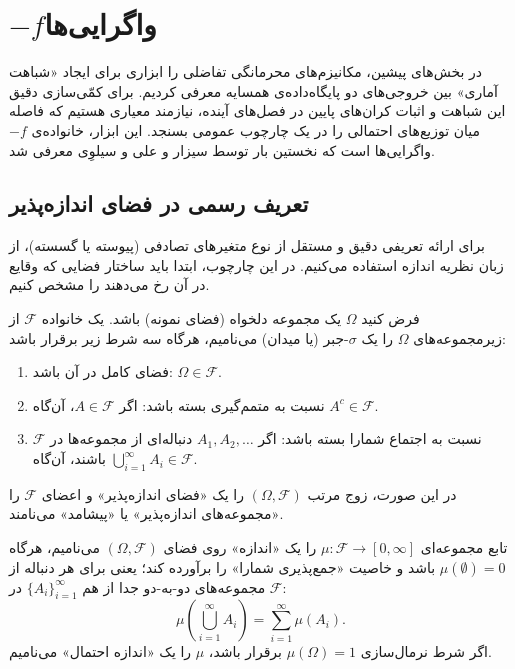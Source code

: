 \section{$-f$واگرایی‌ها}
\label{sec:bg:f-divergence}
در بخش‌های پیشین، مکانیزم‌های محرمانگی تفاضلی را ابزاری برای ایجاد «شباهت آماری» بین خروجی‌های دو پایگاه‌داده‌ی همسایه معرفی کردیم. برای کمّی‌سازی دقیق این شباهت و اثبات کران‌های پایین در فصل‌های آینده، نیازمند معیاری هستیم که فاصله میان توزیع‌های احتمالی را در یک چارچوب عمومی بسنجد. این ابزار، خانواده‌ی $-f$واگرایی‌ها است که نخستین بار توسط سیزار \cite{csiszar1963information} و علی و سیلوِی \cite{Ali1966Silvey} معرفی شد.
\subsection{تعریف رسمی در فضای اندازه‌پذیر}
\label{sec:bg:f-div-def}

برای ارائه تعریفی دقیق و مستقل از نوع متغیرهای تصادفی (پیوسته یا گسسته)، از زبان نظریه اندازه استفاده می‌کنیم. در این چارچوب، ابتدا باید ساختار فضایی که وقایع در آن رخ می‌دهند را مشخص کنیم.
\begin{تعریف}
\label{def:sigma-algebra}
فرض کنید $\Omega$ یک مجموعه دلخواه (فضای نمونه) باشد. یک خانواده $\mathcal{F}$ از زیرمجموعه‌های $\Omega$ را یک $\sigma$-جبر (یا میدان) می‌نامیم، هرگاه سه شرط زیر برقرار باشد:
\begin{enumerate}
    \item فضای کامل در آن باشد: $\Omega \in \mathcal{F}$.
    \item نسبت به متمم‌گیری بسته باشد: اگر $A \in \mathcal{F}$، آن‌گاه $A^c \in \mathcal{F}$.
    \item نسبت به اجتماع شمارا بسته باشد: اگر $A_1, A_2, \dots$ دنباله‌ای از مجموعه‌ها در $\mathcal{F}$ باشند، آن‌گاه $\bigcup_{i=1}^{\infty} A_i \in \mathcal{F}$.
\end{enumerate}
در این صورت، زوج مرتب $(\Omega, \mathcal{F})$ را یک «فضای اندازه‌پذیر» و اعضای $\mathcal{F}$ را «مجموعه‌های اندازه‌پذیر» یا «پیشامد» می‌نامند.
\end{تعریف}

\begin{تعریف}
\label{def:measure}
تابع مجموعه‌ای $\mu: \mathcal{F} \to [0, \infty]$ را یک «اندازه» روی فضای $(\Omega, \mathcal{F})$ می‌نامیم، هرگاه $\mu(\emptyset) = 0$ باشد و خاصیت «جمع‌پذیری شمارا» را برآورده کند؛ یعنی برای هر دنباله از مجموعه‌های دو-به-دو جدا از هم $\{A_i\}_{i=1}^{\infty}$ در $\mathcal{F}$:
\begin{equation}
\mu\left( \bigcup_{i=1}^{\infty} A_i \right) = \sum_{i=1}^{\infty} \mu(A_i).
\end{equation}
اگر شرط نرمال‌سازی $\mu(\Omega) = 1$ برقرار باشد، $\mu$ را یک «اندازه احتمال» می‌نامیم.
\end{تعریف}


